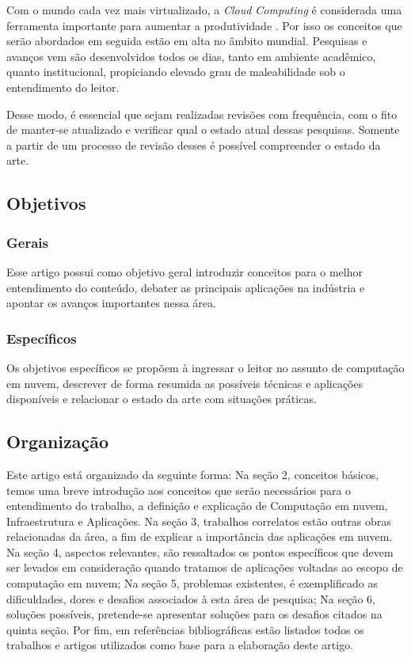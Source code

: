 \documentclass[12pt]{article}
\begin{document}
Com o mundo cada vez mais virtualizado, a \emph{Cloud Computing} é considerada uma ferramenta importante para aumentar a produtividade \cite{loos}. Por isso os conceitos que serão abordados em seguida estão em alta no âmbito mundial. Pesquisas e avanços vem são desenvolvidos todos os dias, tanto em ambiente acadêmico, quanto institucional, propiciando elevado grau de maleabilidade sob o entendimento do leitor.

Desse modo, é essencial que sejam realizadas revisões com frequência, com o fito de manter-se atualizado e verificar qual o estado atual dessas pesquisas. Somente a partir de um processo de revisão desses é possível compreender o estado da arte.

\subsection{Objetivos}

\subsubsection{Gerais}
Esse artigo possui como objetivo geral introduzir conceitos para o melhor entendimento do conteúdo, debater as principais aplicações na indústria e apontar os avanços importantes nessa área.

\subsubsection{Específicos}
Os objetivos específicos se propõem à ingressar o leitor no assunto de computação em nuvem, descrever de forma resumida as possíveis técnicas e aplicações disponíveis e relacionar o estado da arte com situações práticas.

\subsection{Organização}

Este artigo está organizado da seguinte forma:
Na seção 2, conceitos básicos, temos uma breve introdução aos conceitos que serão necessários para o entendimento do trabalho, a definição e explicação de Computação em nuvem, Infraestrutura e Aplicações. Na seção 3, trabalhos correlatos estão outras obras relacionadas da área, a fim de explicar a importância das aplicações em nuvem. Na seção 4, aspectos relevantes, são ressaltados os pontos específicos que devem ser levados em consideração quando tratamos de aplicações voltadas ao escopo de computação em nuvem; Na seção 5, problemas existentes, é exemplificado as dificuldades, dores e desafios associados à esta área de pesquisa; Na seção 6, soluções possíveis, pretende-se apresentar soluções para os desafios citados na quinta seção. Por fim, em referências bibliográficas estão listados todos os trabalhos e artigos utilizados como base para a elaboração deste artigo.
\end{document}
